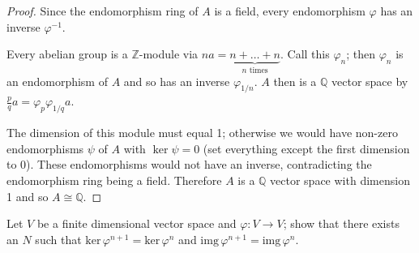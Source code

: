 \documentclass[12pt]{article}
\newcommand{\Z}{\mathbb{Z}}
\newcommand{\Q}{\mathbb{Q}}
\newcommand{\exercise}[1]{\noindent {\bf Exercise #1.}}
\newcommand{\kernel}[0]{\text{ker}\,}
\newcommand{\image}[0]{\text{img}\,}
\begin{document}
\begin{proof}
    Since the endomorphism ring of $A$ is a field, every endomorphism $\varphi$ has an inverse $\varphi^{-1}$.

    Every abelian group is a $\Z$-module via $na = \underbrace{n + \ldots + n}_{n \text{ times}}$.  Call this $\varphi_{n}$; then $\varphi_{n}$ is an endomorphism of $A$ and so has an inverse $\varphi_{1/n}$.  $A$ then is a $\Q$ vector space by $\frac{p}{q} a = \varphi_{p}\varphi_{1/q}a$.

    The dimension of this module must equal 1; otherwise we would have non-zero endomorphisms $\psi$ of $A$ with $\ker{\psi} = 0$ (set everything except the first dimension to 0).  These endomorphisms would not have an inverse, contradicting the endomorphism ring being a field.  Therefore $A$ is a $\Q$ vector space with dimension 1 and so $A \cong \Q$.
\end{proof}

\exercise{1.14} Let $V$ be a finite dimensional vector space and $\varphi : V \to V$; show that there exists an $N$ such that $\kernel \varphi^{n + 1} = \kernel \varphi^{n}$ and $\image \varphi^{n+1} = \image \varphi^n$.
\end{document}
